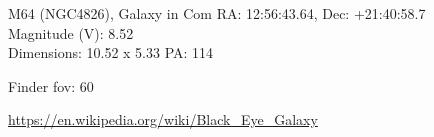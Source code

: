 \begin{block}{M64 (NGC4826), Galaxy in Com}
    RA: 12:56:43.64, Dec: +21:40:58.7 \\ 
    Magnitude (V): 8.52 \\ 
    Dimensions: 10.52 x 5.33 PA: 114 

    Finder fov: 60 

    \url{https://en.wikipedia.org/wiki/Black_Eye_Galaxy} 
\end{block}